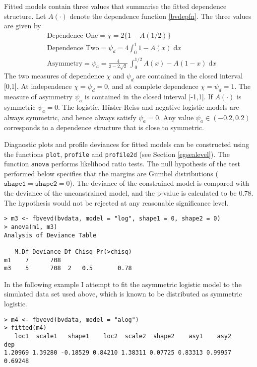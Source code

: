 \documentclass[11pt,a4paper]{article}
\begin{document}
Fitted models contain three values that summarise the fitted dependence structure.
Let $A(\cdot)$ denote the dependence function \eqref{bvdepfn}.
The three values are given by
\begin{align*}
&\text{Dependence One} = \chi = 2\{1-A(1/2)\} \\
&\text{Dependence Two} = \psi_d = 4 \int_0^1 1 - A(x) \; \text{d}x \\
&\text{Asymmetry} = \psi_a = \frac{4}{3 - 2 \sqrt{2}} \, \int_0^{1/2} A(x) - A(1-x) \; \text{d}x
\end{align*}
The two measures of dependence $\chi$ \citep{coleheff99} and $\psi_d$ are contained in the closed interval [0,1]. At independence $\chi = \psi_d = 0$, and at complete dependence $\chi = \psi_d = 1$.
The measure of asymmetry $\psi_a$ is contained in the closed interval [-1,1].
If $A(\cdot)$ is symmetric $\psi_a=0$.
The logistic, H\"{u}sler-Reiss and negative logistic models are always symmetric, and hence always satisfy $\psi_a=0$.
Any value $\psi_a \in (-0.2,0.2)$ corresponds to a dependence structure that is close to symmetric.

Diagnostic plots and profile deviances for fitted models can be constructed using the functions \verb+plot+, \verb+profile+ and \verb+profile2d+ (see Section \ref{egsealevel}).
The function \verb+anova+ performs likelihood ratio tests.
The null hypothesis of the test performed below specifies that the margins are Gumbel distributions ($\texttt{shape1} = \texttt{shape2} = 0$).
The deviance of the constrained model is compared with the deviance of the unconstrained model, and the p-value is calculated to be $0.78$.
The hypothesis would not be rejected at any reasonable significance level.

\begin{verbatim}
> m3 <- fbvevd(bvdata, model = "log", shape1 = 0, shape2 = 0)
> anova(m1, m3)
Analysis of Deviance Table

   M.Df Deviance Df Chisq Pr(>chisq)
m1    7      708                    
m3    5      708  2   0.5       0.78
\end{verbatim}

In the following example I attempt to fit the asymmetric logistic model to the simulated data set used above, which is known to be distributed as symmetric logistic. 

\begin{verbatim}
> m4 <- fbvevd(bvdata, model = "alog")
> fitted(m4)
   loc1  scale1   shape1    loc2  scale2  shape2    asy1    asy2     dep
1.20969 1.39280 -0.18529 0.84210 1.38311 0.07725 0.83313 0.99957 0.69248 
\end{verbatim}
\end{document}
